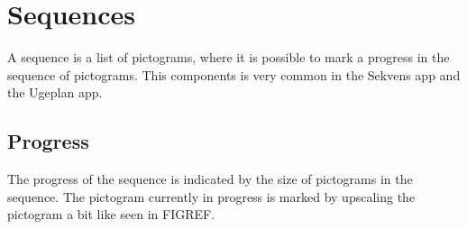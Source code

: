 \chapter{Sequences}
\label{cha:sequences}

A sequence is a list of pictograms, where it is possible to mark a progress in the sequence of pictograms. This components is very common in the Sekvens app and the Ugeplan app.

\section{Progress}
\label{sec:progress}

The progress of the sequence is indicated by the size of pictograms in the sequence. The pictogram currently in progress is marked by upscaling the pictogram a bit like seen in FIGREF.

